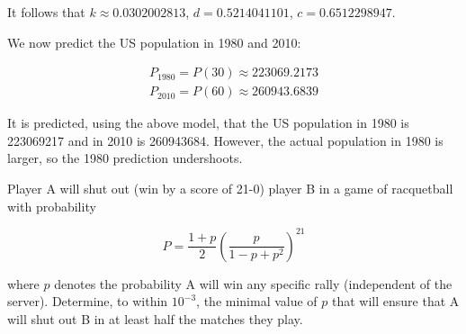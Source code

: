 \documentclass[../../../../Assignments]{subfiles}
\begin{document}
\begin{solution}
    It follows that \(k \approx \num{0.0302002813}\), \(d =
    \num{0.5214041101}\), \(c = \num{0.6512298947}\).

    We now predict the US population in 1980 and 2010:

    \begin{gather*}
        P_{1980} = P(30) \approx \num{223069.2173} \\
        P_{2010} = P(60) \approx \num{260943.6839}
    \end{gather*}

    It is predicted, using the above model, that the US population in 1980 is
    \num{223069217} and in 2010 is \num{260943684}. However, the actual
    population in 1980 is larger, so the 1980 prediction undershoots.
\end{solution}

\begin{exercise}
    Player A will shut out (win by a score of 21-0) player B in a game of
    racquetball with probability

    \[P = \frac{1 + p}{2} \left(\frac{p}{1 - p + p^2}\right)^{21}\]

    \noindent where \(p\) denotes the probability A will win any specific rally
    (independent of the server). Determine, to within \(10^{-3}\), the minimal
    value of \(p\) that will ensure that A will shut out B in at least half the
    matches they play.
\end{exercise}
\end{document}
